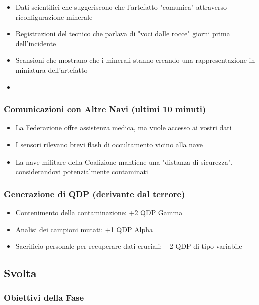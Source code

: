 \documentclass[letterpaper,twocolumn,openany,nodeprecatedcode]{dndbook}
\begin{document}
\begin{itemize}
    \item Dati scientifici che suggeriscono che l'artefatto "comunica" attraverso riconfigurazione minerale
    \item Registrazioni del tecnico che parlava di "voci dalle rocce" giorni prima dell'incidente
    \item Scansioni che mostrano che i minerali stanno creando una rappresentazione in miniatura dell'artefatto
    \item 
\end{itemize}
\subsubsection{Comunicazioni con Altre Navi (ultimi 10 minuti)}

\begin{itemize}
    \item La Federazione offre assistenza medica, ma vuole accesso ai vostri dati
    \item I sensori rilevano brevi flash di occultamento vicino alla nave
    \item La nave militare della Coalizione mantiene una "distanza di sicurezza", considerandovi potenzialmente contaminati
\end{itemize}

\subsubsection{Generazione di QDP (derivante dal terrore)}

\begin{itemize}
    \item Contenimento della contaminazione: +2 QDP Gamma
    \item Analisi dei campioni mutati: +1 QDP Alpha
    \item Sacrificio personale per recuperare dati cruciali: +2 QDP di tipo variabile
\end{itemize}

\subsection{Svolta}

\subsubsection{Obiettivi della Fase}
\end{document}
